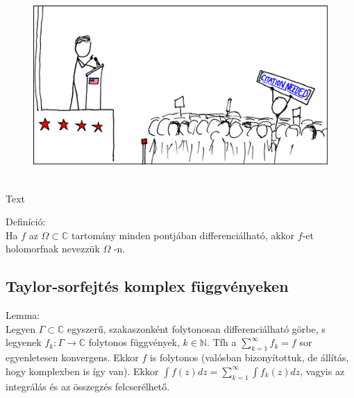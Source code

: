 \documentclass[12pt,a4paper]{scrartcl}
\newenvironment{definicio}{}{}
\newenvironment{allitas}{}{}
\newenvironment{ajanlofig}{\begin{figure}\begin{center}}{
\end{center}\end{figure}}
\begin{document}
\begin{ajanlo}

\begin{ajanlofig}

\href{https://xkcd.com}{\includegraphics[width=5.20833in,height=2.82292in]{wikipedian_protester.png}}

\end{ajanlofig}

Text

\end{ajanlo}

\begin{definicio}

Definíció:\\
Ha \(f\) az \(\Omega \subset {\mathbb{C}}\) tartomány minden pontjában
differenciálható, akkor \(f\)-et holomorfnak nevezzük \(\Omega\) -n.

\end{definicio}

\hypertarget{taylor-sorfejtes-komplex-fuggvenyeken}{%
\subsection{Taylor-sorfejtés komplex
függvényeken}\label{taylor-sorfejtes-komplex-fuggvenyeken}}

\begin{allitas}

Lemma:\\
Legyen \(\Gamma \subset {\mathbb{C}}\) egyszerű, szakaszonként
folytonosan differenciálható görbe, s legyenek
\(\left. f_{k}:\Gamma\rightarrow{\mathbb{C}} \right.\) folytonos
függvények, \(k \in {\mathbb{N}}\). Tfh a
\({\sum\limits_{k = 1}^{\infty}f_{k}} = f\) sor egyenletesen konvergens.
Ekkor \(f\) is folytonos (valósban bizonyítottuk, de állítás, hogy
komplexben is így van). Ekkor
\({\int{f\left( z \right)dz}} = {\sum\limits_{k = 1}^{\infty}{\int{f_{k}\left( z \right)dz}}}\),
vagyis az integrálás és az összegzés felcserélhető.

\end{allitas}
\end{document}
